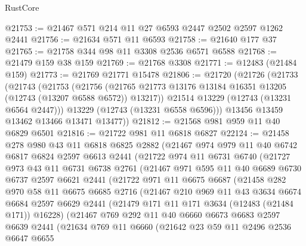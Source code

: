 \begin{lexlean}{RustCore}
\begin{coremodule}
@21753 := @21467 @571 @214 @11 @27 @6593 @2447 @2502 @2597 @1262 @2441
@21756 := @21634 @571 @11 @6593
@21758 := @21640 @177 @37
@21765 := @21758 @344 @98 @11 @3308 @2536 @6571 @6588
@21768 := @21479 @159 @38 @159
@21769 := @21768 @3308
@21771 := @12483 (@21484 @159)
@21773 := @21769 @21771 @15478
@21806 := @21720
    (@21726
      (@21733
        (@21743
          (@21753
            (@21756
              (@21765 @21773 @13176 @13184 @16351 @13205 (@12743 (@13207 @6588 @6572)) @13217))
            @21514
            @13229
            (@12743 (@13231 @6564 @2447)))
          @13229
          (@12743 (@13231 @6558 @6596)))
        @13456
        @13459
        @13462
        @13466
        @13471
        @13477))
@21812 := @21568 @981 @959 @11 @40 @6829 @6501
@21816 := @21722 @981 @11 @6818 @6827
@22124 := @21458
    @278
    @980
    @43
    @11
    @6818
    @6825
    @2882
    (@21467
      @974
      @979
      @11
      @40
      @6742
      @6817
      @6824
      @2597
      @6613
      @2441
      (@21722
        @974
        @11
        @6731
        @6740
        (@21727
          @973
          @43
          @11
          @6731
          @6738
          @2761
          (@21467
            @971
            @595
            @11
            @40
            @6689
            @6730
            @6737
            @2597
            @6621
            @2441
            (@21722
              @971
              @11
              @6675
              @6687
              (@21458
                @282
                @970
                @58
                @11
                @6675
                @6685
                @2716
                (@21467
                  @210
                  @969
                  @11
                  @43
                  @3634
                  @6674
                  @6684
                  @2597
                  @6629
                  @2441
                  (@21479 @171 @11 @171 @3634 (@12483 (@21484 @171)) @16228)
                  (@21467
                    @769
                    @292
                    @11
                    @40
                    @6660
                    @6673
                    @6683
                    @2597
                    @6639
                    @2441
                    (@21634
                      @769
                      @11
                      @6660
                      (@21642
                        @23
                        @59
                        @11
                        @2496
                        @2536
                        @6647
                        @6655

\end{coremodule}
\end{lexlean}
